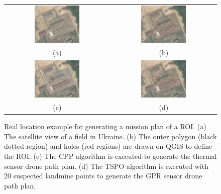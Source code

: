 \begin{figure}[h!]
    \centering
    \begin{tabular}{cc}
        \includegraphics[width=0.45\textwidth]{figs/Jihwan/map1.pdf} &
        \includegraphics[width=0.45\textwidth]{figs/Jihwan/map2.pdf} \\
        (a) & (b) \\[10pt]
        \includegraphics[width=0.45\textwidth]{figs/Jihwan/map3.pdf} &
        \includegraphics[width=0.45\textwidth]{figs/Jihwan/map4.pdf} \\
        (c) & (d)
    \end{tabular}
    \caption[Real Location Example for Mission Planning]
    {Real location example for generating a mission plan of a \gls{ROI}. (a) The satellite view of a field in Ukraine. (b) The outer polygon (black dotted region) and holes (red regions) are drawn on \gls{QGIS} to define the \gls{ROI}. (c) The \gls{CPP} algorithm is executed to generate the thermal sensor drone path plan. (d) The \gls{TSPO} algorithm is executed with 20 suspected landmine points to generate the \gls{GPR} sensor drone path plan. 
    }
    \label{fig:msp_example}
\end{figure}

